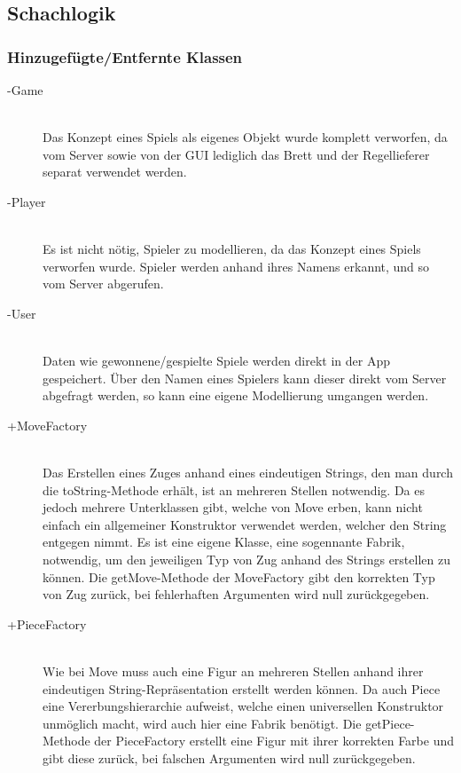 \documentclass[parskip=full]{scrartcl}
\begin{document}
			
		\subsection{Schachlogik}
		
		\subsubsection{Hinzugefügte/Entfernte Klassen}
		\begin{description}
		
		\item[-Game]\hfill \\ Das Konzept eines Spiels als eigenes Objekt wurde komplett verworfen, da vom Server sowie von der GUI lediglich das Brett und der Regellieferer separat verwendet werden. 
		\item[-Player]\hfill \\ Es ist nicht nötig, Spieler zu modellieren, da das Konzept eines Spiels verworfen wurde. Spieler werden anhand ihres Namens erkannt, und so vom Server abgerufen.
		\item[-User]\hfill \\ Daten wie gewonnene/gespielte Spiele werden direkt in der App gespeichert. Über den Namen eines Spielers kann dieser direkt vom Server abgefragt werden, so kann eine eigene Modellierung umgangen werden.
		\item[+MoveFactory]\hfill \\ Das Erstellen eines Zuges anhand eines eindeutigen Strings, den man durch die toString-Methode erhält, ist an mehreren Stellen notwendig. Da es jedoch mehrere Unterklassen gibt, welche von Move erben, kann nicht einfach ein allgemeiner Konstruktor verwendet werden, welcher den String entgegen nimmt. Es ist eine eigene Klasse, eine sogennante Fabrik, notwendig, um den jeweiligen Typ von Zug anhand des Strings erstellen zu können. Die getMove-Methode der MoveFactory gibt den korrekten Typ von Zug zurück, bei fehlerhaften Argumenten wird null zurückgegeben.
		\item[+PieceFactory]\hfill \\ Wie bei Move muss auch eine Figur an mehreren Stellen anhand ihrer eindeutigen String-Repräsentation erstellt werden können. Da auch Piece eine Vererbungshierarchie aufweist, welche einen universellen Konstruktor unmöglich macht, wird auch hier eine Fabrik benötigt. Die getPiece-Methode der PieceFactory erstellt eine Figur mit ihrer korrekten Farbe und gibt diese zurück, bei falschen Argumenten wird null zurückgegeben.
		\end{description}
		
\end{document}
